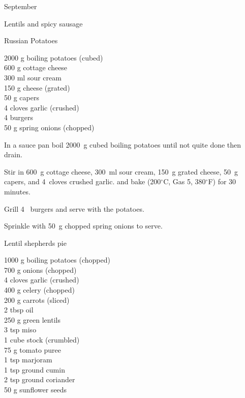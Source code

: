 \begin{menu}{September}
\begin{recipe}{2}{Lentils and spicy sausage}
\begin{instructions}
    \end{instructions}
    \end{recipe}%
  
    \begin{recipe}{2}{Russian Potatoes}%
    
		\begin{ingredients}
		2000 g boiling potatoes (cubed) \\
	600 g cottage cheese  \\
	300 ml sour cream  \\
	150 g cheese (grated) \\
	50 g capers  \\
	4 cloves garlic (crushed) \\
	4  burgers  \\
	50 g spring onions (chopped) \\
	
		\end{ingredients}
	
	
    \begin{instructions}
    \item 
        In a sauce pan boil
        2000~g cubed boiling potatoes
        until not quite done
        then drain.
      \item 
        Stir in
        600~g  cottage cheese,
        300~ml  sour cream,
        150~g grated cheese,
        50~g  capers,
        and
        4~cloves crushed garlic.
        and bake 
      (200$^{\circ}$C, Gas 5, 380$^{\circ}$F)
     for 30 minutes.
      \item 
        Grill 4~  burgers and serve with the potatoes.
      \item 
        Sprinkle with
        50~g chopped spring onions
        to serve.
      
    \end{instructions}
    \end{recipe}%
  
    \begin{recipe}{2}{Lentil shepherds pie}%
    
		\begin{ingredients}
		1000 g boiling potatoes (chopped) \\
	700 g onions (chopped) \\
	4 cloves garlic (crushed) \\
	400 g celery (chopped) \\
	200 g carrots (sliced) \\
	2 tbsp oil  \\
	250 g green lentils  \\
	3 tsp miso  \\
	1 cube stock (crumbled) \\
	75 g tomato puree  \\
	1 tsp marjoram  \\
	1 tsp ground cumin  \\
	2 tsp ground coriander  \\
	50 g sunflower seeds  \\
	

\end{ingredients}
\end{recipe}
\end{menu}

